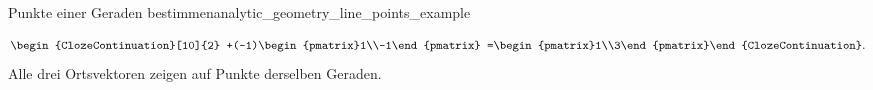 \begin{ExampleBox}{Punkte einer Geraden bestimmen}{analytic_geometry_line_points_example}
\begin{minipage}[t]{0.50\linewidth}
\[\begin{aligned}
\begin{ClozeContinuation}[10]{2}
          +(-1)\begin{pmatrix}1\\-1\end{pmatrix}
        =\begin{pmatrix}1\\3\end{pmatrix}\end{ClozeContinuation}.
    \end{aligned}
  \]
Alle drei Ortsvektoren zeigen auf Punkte derselben Geraden.
\end{minipage}\hfill
\begin{minipage}[t]{0.46\linewidth}
  \vspace{0pt}
  \centering
\end{minipage}
\par\smallskip
\end{ExampleBox}
